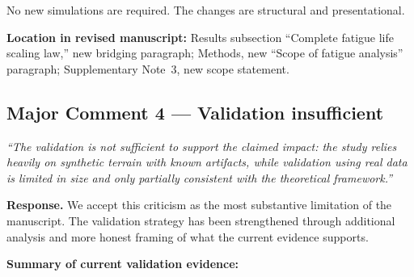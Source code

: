 \documentclass[11pt]{article}
\newcommand{\revquote}[1]{\medskip\noindent\textit{``#1''}\medskip}
\newcommand{\revloc}[1]{\noindent\textbf{Location in revised manuscript:} #1\medskip}
\begin{document}
No new simulations are required. The changes are structural and presentational.

\revloc{Results subsection ``Complete fatigue life scaling law,'' new bridging paragraph; Methods, new ``Scope of fatigue analysis'' paragraph; Supplementary Note~3, new scope statement.}

\bigskip

\subsection*{Major Comment 4 --- Validation insufficient}

\revquote{The validation is not sufficient to support the claimed impact: the study relies heavily on synthetic terrain with known artifacts, while validation using real data is limited in size and only partially consistent with the theoretical framework.}

\noindent\textbf{Response.} We accept this criticism as the most substantive limitation of the manuscript. The validation strategy has been strengthened through additional analysis and more honest framing of what the current evidence supports.

\textbf{Summary of current validation evidence:}
\end{document}
